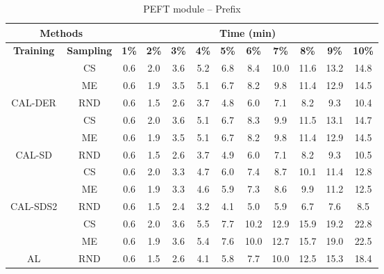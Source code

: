 \begin{table}[htbp]
\begin{subtable}{\linewidth}
\begin{tabular}{c|c|cccccccccc}
\toprule
\multicolumn{2}{c|}{\textbf{Methods}} & \multicolumn{10}{c}{\textbf{Time (min)}} \\
\midrule
\textbf{Training} & \textbf{Sampling} & \textbf{1\%} & \textbf{2\%} & \textbf{3\%} & \textbf{4\%} & \textbf{5\%} & \textbf{6\%} & \textbf{7\%} & \textbf{8\%} & \textbf{9\%} & \textbf{10\%}\\
\midrule
 & CS & 0.6 & 2.0 & 3.6 & 5.2 & 6.8 & 8.4 & 10.0 & 11.6 & 13.2 & 14.8\\

 & ME & 0.6 & 1.9 & 3.5 & 5.1 & 6.7 & 8.2 & 9.8 & 11.4 & 12.9 & 14.5\\

\multirow{-3}{*}{\raggedright\arraybackslash CAL-DER} & RND & 0.6 & 1.5 & 2.6 & 3.7 & 4.8 & 6.0 & 7.1 & 8.2 & 9.3 & 10.4\\
\midrule
 & CS & 0.6 & 2.0 & 3.6 & 5.1 & 6.7 & 8.3 & 9.9 & 11.5 & 13.1 & 14.7\\

 & ME & 0.6 & 1.9 & 3.5 & 5.1 & 6.7 & 8.2 & 9.8 & 11.4 & 12.9 & 14.5\\

\multirow{-3}{*}{\raggedright\arraybackslash CAL-SD} & RND & 0.6 & 1.5 & 2.6 & 3.7 & 4.9 & 6.0 & 7.1 & 8.2 & 9.3 & 10.5\\
\midrule
 & CS & 0.6 & 2.0 & 3.3 & 4.7 & 6.0 & 7.4 & 8.7 & 10.1 & 11.4 & 12.8\\

 & ME & 0.6 & 1.9 & 3.3 & 4.6 & 5.9 & 7.3 & 8.6 & 9.9 & 11.2 & 12.5\\

\multirow{-3}{*}{\raggedright\arraybackslash CAL-SDS2} & RND & 0.6 & 1.5 & 2.4 & 3.2 & 4.1 & 5.0 & 5.9 & 6.7 & 7.6 & 8.5\\
\midrule
 & CS & 0.6 & 2.0 & 3.6 & 5.5 & 7.7 & 10.2 & 12.9 & 15.9 & 19.2 & 22.8\\

 & ME & 0.6 & 1.9 & 3.6 & 5.4 & 7.6 & 10.0 & 12.7 & 15.7 & 19.0 & 22.5\\

\multirow{-3}{*}{\raggedright\arraybackslash AL} & RND & 0.6 & 1.5 & 2.6 & 4.1 & 5.8 & 7.7 & 10.0 & 12.5 & 15.3 & 18.4\\
\bottomrule
\end{tabular}
\end{subtable}
\vspace{1em}
\begin{subtable}{\linewidth}
\centering
\caption{PEFT module -- Prefix}


\end{subtable}
\end{table}
